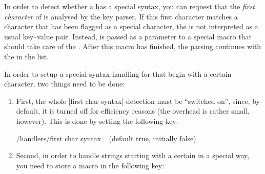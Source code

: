 In order to detect whether a  has a special syntax, you can
request that the \emph{first character} of  is analysed by the key
parser. If this first character matches a character that has been flagged as a
special character, the  is not interpreted as a usual key--value
pair. Instead,  is passed as a parameter to a special macro that
should take care of the . After this macro has finished, the
parsing continues with the  in the list.

In order to setup a special syntax handling for  that begin with
a certain character, two things need to be done:
%
\begin{enumerate}
    \item First, the whole |first char syntax| detection must be ``switched on'',
        since, by default, it is turned off for efficiency reasons (the
        overhead is rather small, however). This is done by setting the
        following key:
        \begin{key}{/handlers/first char syntax= (default true, initially false)}
        \end{key}
    \item Second, in order to handle strings starting with a certain
         in a special way, you need to store a macro in the
        following key:
\end{enumerate}

